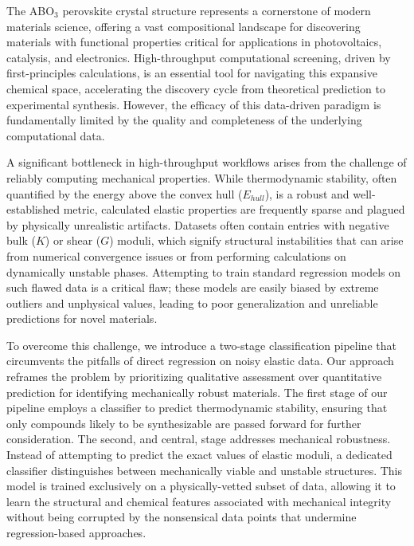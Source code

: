 \documentclass[]{article}
\begin{document}
The ABO$_3$ perovskite crystal structure represents a cornerstone of modern materials science, offering a vast compositional landscape for discovering materials with functional properties critical for applications in photovoltaics, catalysis, and electronics. High-throughput computational screening, driven by first-principles calculations, is an essential tool for navigating this expansive chemical space, accelerating the discovery cycle from theoretical prediction to experimental synthesis. However, the efficacy of this data-driven paradigm is fundamentally limited by the quality and completeness of the underlying computational data.

A significant bottleneck in high-throughput workflows arises from the challenge of reliably computing mechanical properties. While thermodynamic stability, often quantified by the energy above the convex hull ($E_{hull}$), is a robust and well-established metric, calculated elastic properties are frequently sparse and plagued by physically unrealistic artifacts. Datasets often contain entries with negative bulk ($K$) or shear ($G$) moduli, which signify structural instabilities that can arise from numerical convergence issues or from performing calculations on dynamically unstable phases. Attempting to train standard regression models on such flawed data is a critical flaw; these models are easily biased by extreme outliers and unphysical values, leading to poor generalization and unreliable predictions for novel materials.

To overcome this challenge, we introduce a two-stage classification pipeline that circumvents the pitfalls of direct regression on noisy elastic data. Our approach reframes the problem by prioritizing qualitative assessment over quantitative prediction for identifying mechanically robust materials. The first stage of our pipeline employs a classifier to predict thermodynamic stability, ensuring that only compounds likely to be synthesizable are passed forward for further consideration. The second, and central, stage addresses mechanical robustness. Instead of attempting to predict the exact values of elastic moduli, a dedicated classifier distinguishes between mechanically viable and unstable structures. This model is trained exclusively on a physically-vetted subset of data, allowing it to learn the structural and chemical features associated with mechanical integrity without being corrupted by the nonsensical data points that undermine regression-based approaches.
\end{document}
